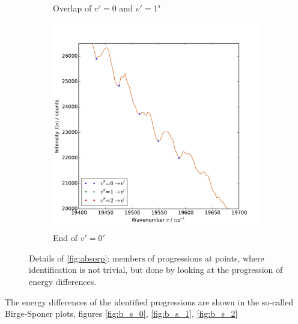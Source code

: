 \begin{figure}
\begin{subfigure}[b]{\picwidth}
        \caption{Overlap of $v'=0$ and $v'=1$"}
        \label{fig:absorp_detail_02}
    \end{subfigure}
    \begin{subfigure}[b]{\picwidth}
        \includegraphics[width=\pltw]{analysis/figures/absorp_03_detail_03.pdf}
        \caption{End of $v'=0'$}
        \label{fig:absorp_detail_03}
    \end{subfigure}
    \caption{Details of \ref{fig:absorp}: members of progressions at points, where identification is not trivial, 
    but done by looking at the progression of energy differences.} 
    \label{fig:absorp_detail}
\end{figure}

The energy differences of the identified progressions are shown in the so-called Birge-Sponer plots, figures 
\ref{fig:b_s_0}, \ref{fig:b_s_1}, \ref{fig:b_s_2}
